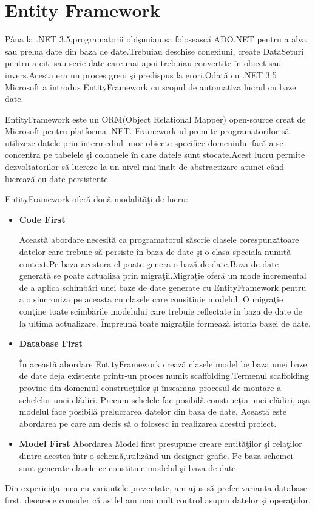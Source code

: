 \documentclass[a4paper,12pt]{report}
\begin{document}
\section{Entity Framework}
P\^ana la .NET 3.5,programatorii obi\c snuiau sa foloseasc\u a ADO.NET pentru a alva sau prelua date din 
baza de date.Trebuiau deschise conexiuni, create DataSeturi pentru a citi sau scrie date care mai apoi trebuiau 
convertite \^in obiect sau invers.Acesta era un proces greoi \c si predispus la erori.Odat\u a cu .NET 3.5
Microsoft a introdus EntityFramework cu scopul de automatiza lucrul cu baze date.

EntityFramework este un ORM(Object Relational Mapper) open-source creat de Microsoft pentru platforma .NET.
Framework-ul premite programatorilor s\u a utilizeze datele prin intermediul  unor obiecte specifice domeniului
far\u a a se concentra pe tabelele \c si coloanele \^in care datele sunt stocate.Acest lucru permite dezvoltatorilor 
s\u a lucreze la un nivel mai \^inalt de abstractizare atunci c\^ and lucreaz\u a cu date persistente.

EntityFramework ofer\u a dou\u a modalit\u a\c ti de lucru:
\begin{itemize}
	\item \textbf{Code First}

		Aceast\u a abordare necesit\u a ca programatorul s\u ascrie clasele corespunz\u atoare datelor care trebuie s\u a persiste \^in baza de date \c si 
		o clasa speciala numit\u a context.Pe baza acestora el poate genera o baz\u a de date.Baza de date generat\u a
		se poate actualiza prin migra\c tii.Migra\c tie ofer\u a un mode incremental de a aplica schimb\u ari unei baze
		de date generate cu EntityFramework pentru a o sincroniza pe aceasta cu clasele care consitiuie modelul. O migra\c tie
		con\c tine toate scimb\u arile modelului care trebuie reflectate \^in baza de date de la ultima actualizare.
		\^Impreun\u a toate migra\c tile formeaz\u a istoria bazei de date.

	\item \textbf{Database First}

		\^In aceast\u a abordare EntityFramework creaz\u a clasele model be baza unei baze de date deja existente printr-un proces numit
		scaffolding.Termenul scaffolding provine din domeniul construc\c tiilor \c si \^inseamna procesul de montare a schelelor unei cl\u adiri.
		Precum schelele fac posibil\u a construc\c tia unei cl\u adiri, a\c sa modelul face posibil\u a prelucrarea datelor din baza de date.
		Aceast\u a este abordarea pe care am decis s\u a o folosesc \^in realizarea acestui proiect.
	\item \textbf{Model First}
		Abordarea Model first presupune creare entit\u a\c tilor \c si rela\c tilor dintre acestea \^intr-o schem\u a,utiliz\^and un designer grafic.
		Pe baza schemei sunt generate clasele ce constituie modelul \c si baza de date.
\end{itemize} 
Din experien\c ta mea cu variantele prezentate, am ajus s\u a prefer varianta database first, deoarece consider c\u a astfel am mai mult control
asupra datelor \c si opera\c tiilor.
\end{document}
